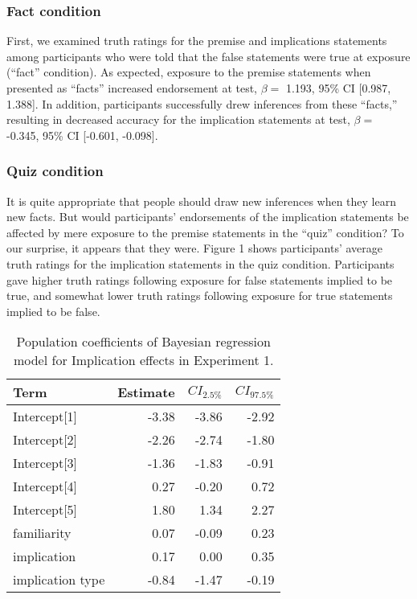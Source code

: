 \documentclass[10pt, letterpaper]{article}
\newenvironment{CodeChunk}{}{}
\begin{document}
\hypertarget{fact-condition}{%
\subsubsection{Fact condition}\label{fact-condition}}

First, we examined truth ratings for the premise and implications
statements among participants who were told that the false statements
were true at exposure (``fact'' condition). As expected, exposure to the
premise statements when presented as ``facts'' increased endorsement at
test, \(\beta =\) 1.193, 95\% CI {[}0.987, 1.388{]}. In addition,
participants successfully drew inferences from these ``facts,''
resulting in decreased accuracy for the implication statements at test,
\(\beta =\) -0.345, 95\% CI {[}-0.601, -0.098{]}.

\hypertarget{quiz-condition}{%
\subsubsection{Quiz condition}\label{quiz-condition}}

It is quite appropriate that people should draw new inferences when they
learn new facts. But would participants' endorsements of the implication
statements be affected by mere exposure to the premise statements in the
``quiz'' condition? To our surprise, it appears that they were. Figure 1
shows participants' average truth ratings for the implication statements
in the quiz condition. Participants gave higher truth ratings following
exposure for false statements implied to be true, and somewhat lower
truth ratings following exposure for true statements implied to be
false.

\begin{CodeChunk}
\begin{table}

\caption{\label{tab:make-tables}Population coefficients of Bayesian regression model for Implication effects in Experiment 1.}
\centering
\begin{tabular}[t]{lrrr}
\toprule
Term & Estimate & $CI_{2.5\%}$ & $CI_{97.5\%}$\\
\midrule
Intercept[1] & -3.38 & -3.86 & -2.92\\
Intercept[2] & -2.26 & -2.74 & -1.80\\
Intercept[3] & -1.36 & -1.83 & -0.91\\
Intercept[4] & 0.27 & -0.20 & 0.72\\
Intercept[5] & 1.80 & 1.34 & 2.27\\
\addlinespace
familiarity & 0.07 & -0.09 & 0.23\\
implication & 0.17 & 0.00 & 0.35\\
implication type & -0.84 & -1.47 & -0.19\\
\bottomrule
\end{tabular}
\end{table}

\end{CodeChunk}
\end{document}
